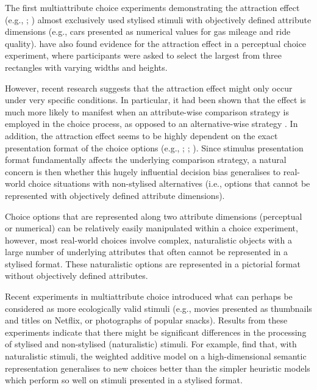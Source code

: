 \documentclass[12pt, a4paper]{article}
\begin{document}
The first multiattribute choice experiments demonstrating the attraction effect (e.g., ; ) almost exclusively used stylised stimuli with objectively defined attribute dimensions (e.g., cars presented as numerical values for gas mileage and ride quality).  have also found evidence for the attraction effect in a perceptual choice experiment, where participants were asked to select the largest from three rectangles with varying widths and heights. 


However, recent research suggests that the attraction effect might only occur under very specific conditions.
In particular, it had been shown that the effect is much more likely to manifest when an attribute-wise comparison strategy is employed in the choice process, as opposed to an alternative-wise strategy \cite{Noguchi2014a}. In addition, the attraction effect seems to be highly dependent on the exact presentation format of the choice options (e.g., ; ; ). Since stimulus presentation format fundamentally affects the underlying comparison strategy, a natural concern is then whether this hugely influential decision bias generalises to real-world choice situations with non-stylised alternatives (i.e., options that cannot be represented with objectively defined attribute dimensions).  


Choice options that are represented along two attribute dimensions (perceptual or numerical) can be relatively easily manipulated within a choice experiment, however, most real-world choices involve complex, naturalistic objects with a large number of underlying attributes that often cannot be represented in a stylised format. 
These naturalistic options are represented in a pictorial format without objectively defined attributes.

 Recent experiments in multiattribute choice introduced what can perhaps be considered as more ecologically valid stimuli (e.g., movies presented as thumbnails and titles on Netflix, or photographs of popular snacks). Results from these experiments indicate that there might be significant differences in the processing of stylised and non-stylised (naturalistic) stimuli. For example,  find that, with naturalistic stimuli, the weighted additive model on a high-dimensional semantic representation generalises to new choices better than the simpler heuristic models which perform so well on stimuli presented in a stylised format.
\end{document}
